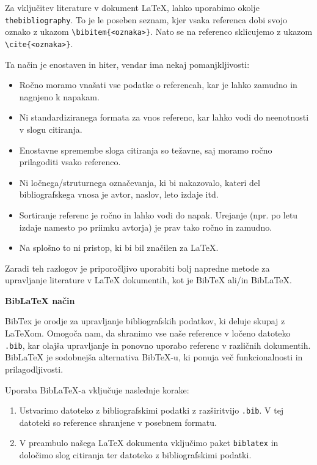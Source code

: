 Za vključitev literature v dokument LaTeX, lahko uporabimo okolje \texttt{thebibliography}.
To je le poseben seznam, kjer vsaka referenca dobi svojo oznako z ukazom \texttt{{\textbackslash}bibitem\{\textless oznaka\textgreater \}}.
Nato se na referenco sklicujemo z ukazom \texttt{{\textbackslash}cite\{\textless oznaka\textgreater \}}.

\begin{example}\label{eg_literatura_1}\end{example}Ta način je enostaven in hiter, vendar ima nekaj pomanjkljivosti:

\begin{itemize}
\item Ročno moramo vnašati vse podatke o referencah, kar je lahko zamudno in nagnjeno k napakam.
\item Ni standardiziranega formata za vnos referenc, kar lahko vodi do neenotnosti v slogu citiranja.
\item Enostavne spremembe sloga citiranja so težavne, saj moramo ročno prilagoditi vsako referenco.
\item Ni ločnega/struturnega označevanja, ki bi nakazovalo, kateri del bibliografskega vnosa je avtor, naslov, leto izdaje itd.
\item Sortiranje referenc je ročno in lahko vodi do napak. Urejanje (npr. po letu izdaje namesto po priimku avtorja) je prav tako ročno in zamudno.
\item Na splošno to ni pristop, ki bi bil značilen za LaTeX.
\end{itemize}

Zaradi teh razlogov je priporočljivo uporabiti bolj napredne metode za upravljanje literature v LaTeX dokumentih, kot je BibTeX ali/in BibLaTeX.

\textbf{BibLaTeX način}

BibTex je orodje za upravljanje bibliografskih podatkov, ki deluje skupaj z LaTeXom.
Omogoča nam, da shranimo vse naše reference v ločeno datoteko \texttt{.bib}, kar olajša upravljanje in ponovno uporabo referenc v različnih dokumentih.
BibLaTeX je sodobnejša alternativa BibTeX-u, ki ponuja več funkcionalnosti in prilagodljivosti.

Uporaba BibLaTeX-a vključuje naslednje korake:

\begin{enumerate}
\item Ustvarimo datoteko z bibliografskimi podatki z razširitvijo \texttt{.bib}. V tej datoteki so reference shranjene v posebnem formatu.
\item V preambulo našega LaTeX dokumenta vključimo paket \texttt{biblatex} in določimo slog citiranja ter datoteko z bibliografskimi podatki.
\end{enumerate}

